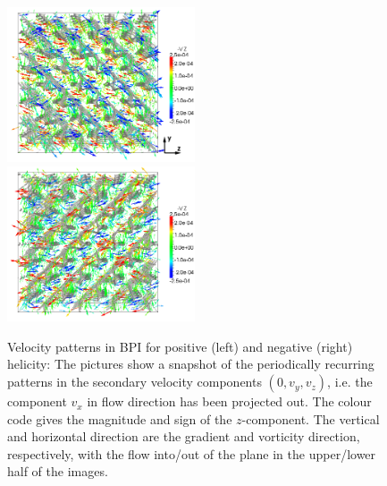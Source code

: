 \documentclass[aps,pre,reprint,superscriptaddress, twocolumn]{revtex4}
\begin{document}
\begin{figure}[htpb]
\includegraphics[width=0.495\textwidth]{v_yz-v_z-360k_run914.png}
\includegraphics[width=0.495\textwidth]{v_yz-v_z-360k_run922.png}
\caption{Velocity patterns in BPI for positive (left) and negative (right) helicity: 
The pictures show a snapshot of the periodically recurring patterns in the 
secondary velocity components $(0,v_y,v_z)$, i.e. the component $v_x$ in flow direction 
has been projected out. The colour code gives the magnitude and sign 
of the $z$-component. The vertical and horizontal direction are the gradient and 
vorticity direction, respectively, with the flow into/out of the plane in the 
upper/lower half of the images.}
\label{bp1-velo}
\end{figure}
\end{document}
